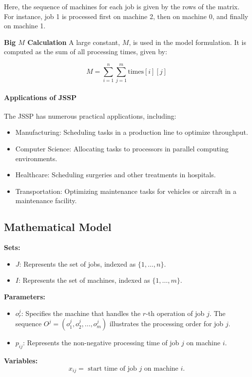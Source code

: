 {Here, the sequence of machines for each job is given by the rows of the matrix. For instance, job 1 is processed first on machine 2, then on machine 0, and finally on machine 1.

\textbf{Big \(M\) Calculation}
A large constant, \( M \), is used in the model formulation. It is computed as the sum of all processing times, given by:

\[
M = \sum_{i=1}^{n} \sum_{j=1}^{m} \text{times}[i][j]
\]




\paragraph{Applications of JSSP}
The JSSP has numerous practical applications, including:
\begin{itemize}
  \item Manufacturing: Scheduling tasks in a production line to optimize throughput.
  \item Computer Science: Allocating tasks to processors in parallel computing environments.
  \item Healthcare: Scheduling surgeries and other treatments in hospitals.
  \item Transportation: Optimizing maintenance tasks for vehicles or aircraft in a maintenance facility.
\end{itemize}


\subsection{Mathematical Model}


\noindent \textbf{Sets:}
\begin{itemize}
  \item \( J\): Represents the set of jobs, indexed as \( \{1, \ldots, n\} \).
  \item \( I \): Represents the set of machines, indexed as \( \{1, \ldots, m\} \).
  \end{itemize}
\noindent \textbf{Parameters:}
\begin{itemize}
 \item \( o_r^j \): Specifies the machine that handles the \( r \)-th operation of job \( j \). The sequence \( O^j=\left(o_1^j, o_2^j, \ldots, o_m^j\right) \) illustrates the processing order for job \( j \).
  \item \( p_{i j} \): Represents the non-negative processing time of job \( j \) on machine \( i \).
\end{itemize}
\noindent \textbf{Variables:}
$$
x_{ij} = \text{ start time of job $j$ on machine $i$}.
$$

}
